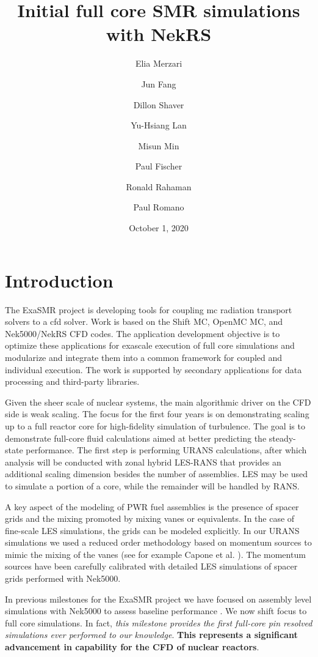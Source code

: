 \documentclass[11pt]{anlreport}
\title{Initial full core SMR simulations with NekRS}
\author[1,2]{\rm Elia Merzari}
\author[2]{Jun Fang}
\author[2]{Dillon Shaver}
\author[3]{Yu-Hsiang Lan}
\author[3]{Misun Min}
\author[3]{Paul Fischer}
\author[4]{Ronald Rahaman}
\author[4]{Paul Romano}
\affil[1]{Nuclear Engineering Department, Pennsylvania State University}
\affil[2]{Nuclear Science and Engineering Division, Argonne National Laboratory}
\affil[3]{Mathematics and Computer Science Division, Argonne National Laboratory}
\affil[4]{Computational Science Division, Argonne National Laboratory }
\date{October 1, 2020}
\begin{document}
\clearpage
\thispagestyle{empty}
\tableofcontents
\clearpage
\listoffigures
\listoftables
\newpage
\printglossary
\newpage

\graphicspath{{./Figs/}}



\newpage
{}
\setcounter{page}{1}


\section{Introduction}

The ExaSMR project is developing tools for coupling \acf{mc} radiation
transport solvers to a \acf{cfd} solver.  Work is based on the Shift MC, OpenMC MC, and Nek5000/NekRS CFD codes. The application development objective is to optimize these applications for exascale execution of full core simulations and modularize and integrate them into a common framework for coupled and individual execution. The work is supported by secondary applications for data processing and third-party libraries.

Given the sheer scale of nuclear systems, the main algorithmic driver on the CFD side is weak scaling.
The focus for the first four years is  on demonstrating scaling up to a full reactor core for high-fidelity simulation of turbulence. The goal is to demonstrate full-core fluid calculations aimed at better predicting the steady-state performance. The first step is performing URANS calculations, after which analysis will be conducted with zonal hybrid LES-RANS that provides an additional scaling dimension besides the number of assemblies. LES may be used to simulate a portion of a core, while the remainder will be handled by RANS.

A key aspect of the modeling of PWR fuel assemblies is the presence of spacer grids and the mixing promoted by mixing vanes or equivalents. In the case of fine-scale LES simulations, the grids can be modeled explicitly. In our URANS simulations we used a reduced order methodology based on momentum sources to mimic the mixing of the vanes (see for example Capone et al. \cite{Capone2016}). The momentum sources have been carefully calibrated with detailed LES simulations of spacer grids performed with Nek5000.

In previous milestones for the ExaSMR project we have focused on assembly level simulations with Nek5000 to assess baseline performance \cite{merzari2018performance} \cite{merzari2020wall}. We now shift focus to full core simulations. In fact, \textit{this milestone provides the first full-core pin resolved simulations ever performed to our knowledge}. \textbf{This represents a significant advancement in capability for the CFD of nuclear reactors}.
\end{document}

